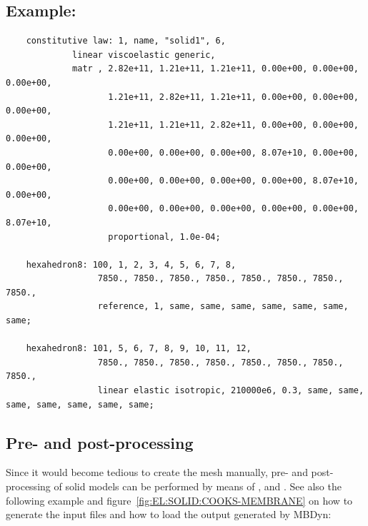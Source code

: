 \subsection{Example:}
\begin{verbatim}
    constitutive law: 1, name, "solid1", 6,
             linear viscoelastic generic,
             matr , 2.82e+11, 1.21e+11, 1.21e+11, 0.00e+00, 0.00e+00, 0.00e+00,
                    1.21e+11, 2.82e+11, 1.21e+11, 0.00e+00, 0.00e+00, 0.00e+00,
                    1.21e+11, 1.21e+11, 2.82e+11, 0.00e+00, 0.00e+00, 0.00e+00,
                    0.00e+00, 0.00e+00, 0.00e+00, 8.07e+10, 0.00e+00, 0.00e+00,
                    0.00e+00, 0.00e+00, 0.00e+00, 0.00e+00, 8.07e+10, 0.00e+00,
                    0.00e+00, 0.00e+00, 0.00e+00, 0.00e+00, 0.00e+00, 8.07e+10,
                    proportional, 1.0e-04;

    hexahedron8: 100, 1, 2, 3, 4, 5, 6, 7, 8,
                  7850., 7850., 7850., 7850., 7850., 7850., 7850., 7850.,
                  reference, 1, same, same, same, same, same, same, same;

    hexahedron8: 101, 5, 6, 7, 8, 9, 10, 11, 12,
                  7850., 7850., 7850., 7850., 7850., 7850., 7850., 7850.,
                  linear elastic isotropic, 210000e6, 0.3, same, same, same, same, same, same, same;
\end{verbatim}

\subsection{Pre- and post-processing}
\label{sec:EL:SOLID:preprocessing}
Since it would become tedious to create the mesh manually, pre- and post-processing of solid models
can be performed by means of ,
and .
See also the following example and figure~\ref{fig:EL:SOLID:COOKS-MEMBRANE} on how to generate the input files and how to load the output generated by MBDyn:

